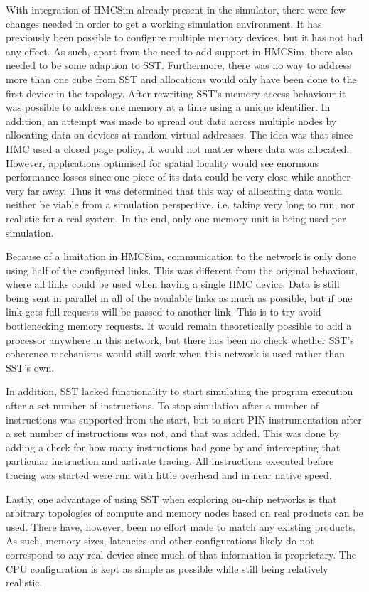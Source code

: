 With integration of HMCSim already present in the simulator, there were few changes needed in order to get a working simulation environment. It has previously been possible to configure multiple memory devices, but it has not had any effect. As such, apart from the need to add support in HMCSim, there also needed to be some adaption to SST. Furthermore, there was no way to address more than one cube from SST and allocations would only have been done to the first device in the topology. After rewriting SST's memory access behaviour it was possible to address one memory at a time using a unique identifier. In addition, an attempt was made to spread out data across multiple nodes by allocating data on devices at random virtual addresses. The idea was that since HMC used a closed page policy, it would not matter where data was allocated. However, applications optimised for spatial locality would see enormous performance losses since one piece of its data could be very close while another very far away. Thus it was determined that this way of allocating data would neither be viable from a simulation perspective, i.e. taking very long to run, nor realistic for a real system. In the end, only one memory unit is being used per simulation.
\bigskip

Because of a limitation in HMCSim, communication to the network is only done using half of the configured links. This was different from the original behaviour, where all links could be used when having a single HMC device. Data is still being sent in parallel in all of the available links as much as possible, but if one link gets full requests will be passed to another link. This is to try avoid bottlenecking memory requests. It would remain theoretically possible to add a processor anywhere in this network, but there has been no check whether SST's coherence mechanisms would still work when this network is used rather than SST's own. 
\bigskip

In addition, SST lacked functionality to start simulating the program execution after a set number of instructions. To stop simulation after a number of instructions was supported from the start, but to start PIN instrumentation after a set number of instructions was not, and that was added. This was done by adding a check for how many instructions had gone by and intercepting that particular instruction and activate tracing. All instructions executed before tracing was started were run with little overhead and in near native speed.
\bigskip

Lastly, one advantage of using SST when exploring on-chip networks is that arbitrary topologies of compute and memory nodes based on real products can be used. There have, however, been no effort made to match any existing products. As such, memory sizes, latencies and other configurations likely do not correspond to any real device since much of that information is proprietary. The CPU configuration is kept as simple as possible while still being relatively realistic.

